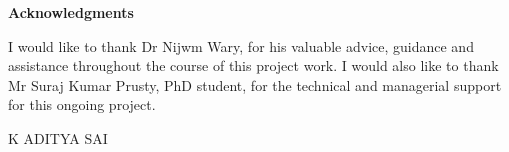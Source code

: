 \newpage


\thispagestyle{empty}
\begin{center}
	\textbf{\Large Acknowledgments}
\end{center}

I would like to thank Dr Nijwm Wary, for his valuable advice, guidance and assistance throughout the course of this project work. I would also like to thank Mr Suraj Kumar Prusty, PhD student, for the technical and managerial support for this ongoing project.


\vspace{3em}
\begin{flushright}
	K ADITYA SAI
\end{flushright}
